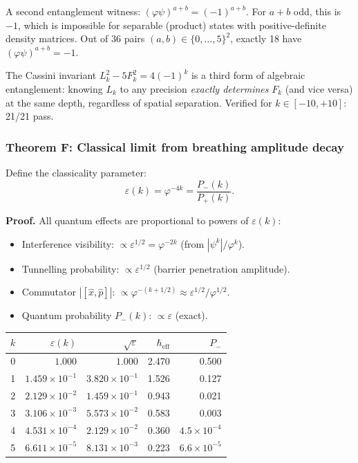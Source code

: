 \documentclass[12pt,a4paper]{article}
\begin{document}
A second entanglement witness: $(\varphi\psi)^{a+b} = (-1)^{a+b}$. For $a + b$ odd, this is $-1$, which is impossible for separable (product) states with positive-definite density matrices. Out of 36 pairs $(a, b) \in \{0,\ldots,5\}^2$, exactly 18 have $(\varphi\psi)^{a+b} = -1$.

The Cassini invariant $L_k^2 - 5F_k^2 = 4(-1)^k$ is a third form of algebraic entanglement: knowing $L_k$ to any precision \emph{exactly determines} $F_k$ (and vice versa) at the same depth, regardless of spatial separation. Verified for $k \in [-10, +10]$: 21/21 pass.

\subsubsection{Theorem F: Classical limit from breathing amplitude decay}

Define the classicality parameter:
\begin{equation}
\varepsilon(k) = \varphi^{-4k} = \frac{P_-(k)}{P_+(k)}.
\end{equation}

\textbf{Proof.} All quantum effects are proportional to powers of $\varepsilon(k)$:
\begin{itemize}[nosep]
\item Interference visibility: $\propto \varepsilon^{1/2} = \varphi^{-2k}$ (from $|\psi^k|/\varphi^k$).
\item Tunnelling probability: $\propto \varepsilon^{1/2}$ (barrier penetration amplitude).
\item Commutator $|[\hat{x}, \hat{p}]|$: $\propto \varphi^{-(k+1/2)} \approx \varepsilon^{1/2} / \varphi^{1/2}$.
\item Quantum probability $P_-(k)$: $\propto \varepsilon$ (exact).
\end{itemize}

\begin{center}
\small
\begin{tabular}{|c|r|r|r|r|}
\hline
$k$ & $\varepsilon(k)$ & $\sqrt{\varepsilon}$ & $\hbar_{\mathrm{eff}}$ & $P_-$ \\
\hline
0 & $1.000$ & $1.000$ & 2.470 & 0.500 \\
1 & $1.459 \times 10^{-1}$ & $3.820 \times 10^{-1}$ & 1.526 & 0.127 \\
2 & $2.129 \times 10^{-2}$ & $1.459 \times 10^{-1}$ & 0.943 & 0.021 \\
3 & $3.106 \times 10^{-3}$ & $5.573 \times 10^{-2}$ & 0.583 & 0.003 \\
4 & $4.531 \times 10^{-4}$ & $2.129 \times 10^{-2}$ & 0.360 & $4.5 \times 10^{-4}$ \\
5 & $6.611 \times 10^{-5}$ & $8.131 \times 10^{-3}$ & 0.223 & $6.6 \times 10^{-5}$ \\
\hline
\end{tabular}
\end{center}
\end{document}
